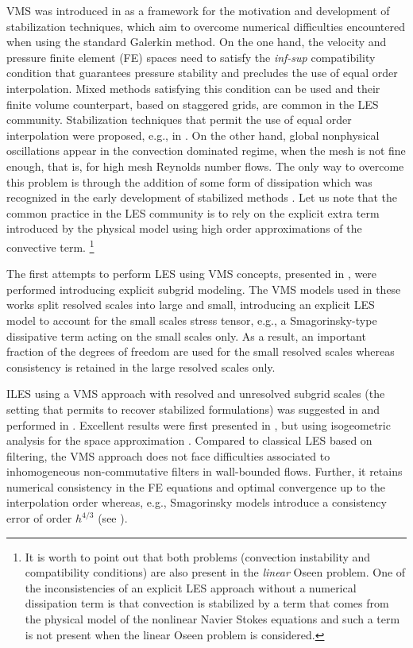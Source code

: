 VMS was introduced in \cite{hughes_multiscale_1995,hughes_variational_1998} as a framework for the motivation and development of stabilization techniques, which aim to overcome numerical difficulties encountered when using the standard Galerkin method. On the one hand, the velocity and pressure finite element (FE) spaces need to satisfy the \textit{inf-sup} compatibility condition that guarantees pressure stability and precludes the use of equal order interpolation. Mixed methods satisfying this condition can be used and their finite volume counterpart, based on staggered grids, are common in the LES community. Stabilization techniques that permit the use of equal order interpolation were proposed, e.g., in \cite{Douglas_1989,Hughes_1986_5}. %
On the other hand, global nonphysical oscillations appear in the convection dominated regime, when the mesh is not fine enough, that is, for high mesh Reynolds number flows. The only way to overcome this problem is through the addition of some form of dissipation which was recognized in the early development of stabilized methods \cite{Brooks_1982}. Let us note that  the common practice in the LES community is to rely on the explicit extra term introduced by the physical model using high order approximations of the convective term.
\footnote{It is worth to point out that both problems (convection instability and compatibility conditions) are also present in the \textit{linear} Oseen problem. One of the inconsistencies of an explicit LES approach without a numerical dissipation term is that convection is stabilized by a term that comes from the physical model of the nonlinear Navier Stokes equations and such a term is not present when the linear Oseen problem is considered.} 

The first attempts to perform LES using VMS concepts, presented in \cite{Hughes2000,hughes_large_2001,hughes_multiscale_2001,Koobus2004,john_variants_2008},  were performed introducing explicit subgrid modeling. The VMS models used in these works split resolved scales into large and small, introducing an explicit LES model to account for the small scales stress tensor, e.g., a Smagorinsky-type dissipative term acting on the small scales only. As a result, an important fraction of the degrees of freedom are used for the small resolved scales whereas consistency is retained in the large resolved scales only. 

ILES using a VMS approach with resolved and unresolved subgrid scales (the setting that permits to recover stabilized formulations) was suggested in \cite{codina_stabilized_2002} and performed in \cite{Calo_2004,bazilevs_variational_2007,nogueira_implicit_2010}. Excellent results were first presented in \cite{bazilevs_variational_2007}, but using isogeometric analysis for the space approximation \cite{Hughes_2005a}. Compared to classical LES based on filtering, the VMS approach does not face difficulties associated to inhomogeneous non-commutative filters in wall-bounded flows. Further, it retains numerical consistency in the FE equations and optimal convergence up to the interpolation order whereas, e.g., Smagorinsky models introduce a consistency error of order $h^{4/3}$ (see \cite{Hughes2000,hughes_large_2001,bazilevs_variational_2007}).

